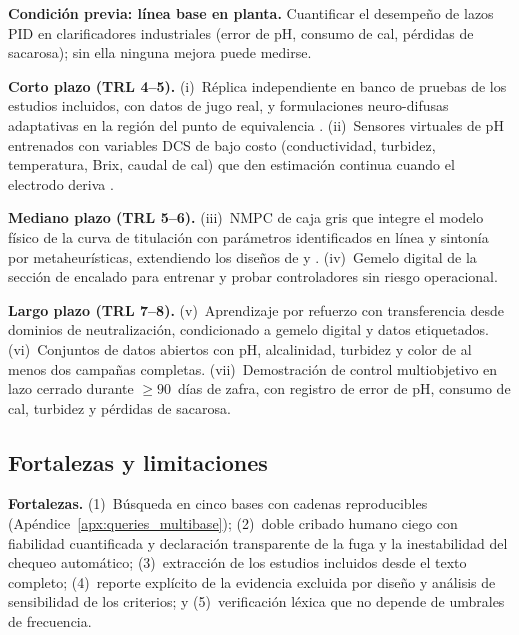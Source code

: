\noindent\textbf{Condición previa: línea base en planta.} Cuantificar el
desempeño de lazos PID en clarificadores industriales (error de pH,
consumo de cal, pérdidas de sacarosa); sin ella ninguna mejora puede
medirse.

\noindent\textbf{Corto plazo (TRL 4--5).}
(i)~Réplica independiente en banco de pruebas de los estudios incluidos,
con datos de jugo real, y formulaciones neuro-difusas adaptativas en la
región del punto de equivalencia
\parencite{herediamolinero2014feedback,suguna2026advanced}.
(ii)~Sensores virtuales de pH entrenados con variables DCS de bajo costo
(conductividad, turbidez, temperatura, Brix, caudal de cal) que den
estimación continua cuando el electrodo deriva
\parencite{son2021deep,xu2022datadriven}.

\noindent\textbf{Mediano plazo (TRL 5--6).}
(iii)~NMPC de caja gris que integre el modelo físico de la curva de
titulación con parámetros identificados en línea y sintonía por
metaheurísticas, extendiendo los diseños de
\cite{palaciomorales2021optimiza} y \cite{murugesan2020computeraided}.
(iv)~Gemelo digital de la sección de encalado para entrenar y probar
controladores sin riesgo operacional.

\noindent\textbf{Largo plazo (TRL 7--8).}
(v)~Aprendizaje por refuerzo con transferencia desde dominios de
neutralización, condicionado a gemelo digital y datos etiquetados.
(vi)~Conjuntos de datos abiertos con pH, alcalinidad, turbidez y color de
al menos dos campañas completas.
(vii)~Demostración de control multiobjetivo en lazo cerrado durante
$\geq 90$~días de zafra, con registro de error de pH, consumo de cal,
turbidez y pérdidas de sacarosa.

\subsection{Fortalezas y limitaciones}
\label{sub:limitaciones}

\noindent\textbf{Fortalezas.}
(1)~Búsqueda en cinco bases con cadenas reproducibles
(Apéndice~\ref{apx:queries_multibase});
(2)~doble cribado humano ciego con fiabilidad cuantificada y declaración
transparente de la fuga y la inestabilidad del chequeo automático;
(3)~extracción de los estudios incluidos desde el texto completo;
(4)~reporte explícito de la evidencia excluida por diseño y análisis de
sensibilidad de los criterios; y
(5)~verificación léxica que no depende de umbrales de frecuencia.

